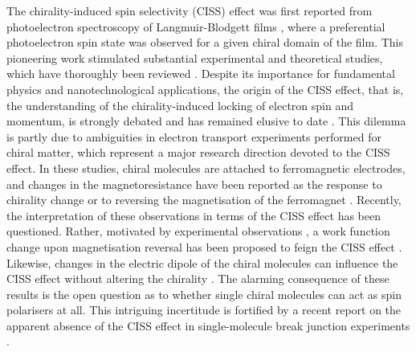 \documentclass[aps,floatfix,12pt]{revtex4-2}
\begin{document}
The chirality-induced spin selectivity (CISS) effect was first reported from photoelectron spectroscopy of Langmuir-Blodgett films \cite{science_283_814}, where a preferential photoelectron spin state was observed for a given chiral domain of the film.
This pioneering work stimulated substantial experimental and theoretical studies, which have thoroughly been reviewed \cite{chemrev_124_1950,natrevchem_3_250,jpcm_37_113003}.
Despite its importance for fundamental physics and nanotechnological applications, the origin of the CISS effect, that is, the understanding of the chirality-induced locking of electron spin and momentum, is strongly debated and has remained elusive to date \cite{rmp_92_035001,acsnano_19_37484}.
This dilemma is partly due to ambiguities in electron transport experiments performed for chiral matter, which represent a major research direction devoted to the CISS effect.
In these studies, chiral molecules are attached to ferromagnetic electrodes, and changes in the magnetoresistance have been reported as the response to chirality change or to reversing the magnetisation of the ferromagnet \cite{acie_59_14671,jacs_143_7189,small_19_2302714,small_20_2308233}.
Recently, the interpretation of these observations in terms of the CISS effect has been questioned.
Rather, motivated by experimental observations \cite{jacs_141_3863,jpcl_11_1550,nl_23_8280}, a work function change upon magnetisation reversal has been proposed to feign the CISS effect \cite{acsnano_18_6028}.
Likewise, changes in the electric dipole of the chiral molecules can influence the CISS effect without altering the chirality \cite{natcommun_7_10744,chemsci_15_14905,jacs_147_36453}.
The alarming consequence of these results is the open question as to whether single chiral molecules can act as spin polarisers at all.
This intriguing incertitude is fortified by a recent report on the apparent absence of the CISS effect in single-molecule break junction experiments \cite{jacs_147_25043}.
\end{document}
